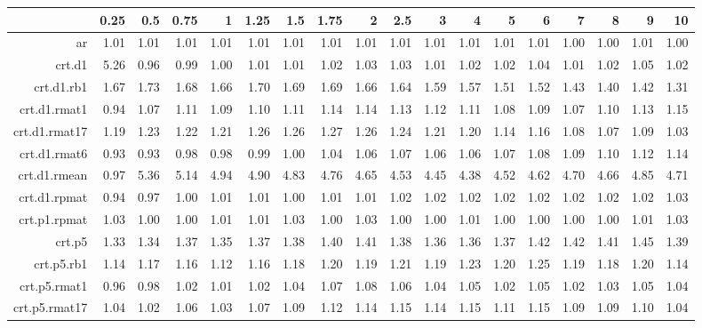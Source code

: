 \begin{tabular}{rrrrrrrrrrrrrrrrrr}
  \hline
 & 0.25 & 0.5 & 0.75 & 1 & 1.25 & 1.5 & 1.75 & 2 & 2.5 & 3 & 4 & 5 & 6 & 7 & 8 & 9 & 10 \\ 
  \hline
ar & 1.01 & 1.01 & 1.01 & 1.01 & 1.01 & 1.01 & 1.01 & 1.01 & 1.01 & 1.01 & 1.01 & 1.01 & 1.01 & 1.00 & 1.00 & 1.01 & 1.00 \\ 
  crt.d1 & 5.26 & 0.96 & 0.99 & 1.00 & 1.01 & 1.01 & 1.02 & 1.03 & 1.03 & 1.01 & 1.02 & 1.02 & 1.04 & 1.01 & 1.02 & 1.05 & 1.02 \\ 
  crt.d1.rb1 & 1.67 & 1.73 & 1.68 & 1.66 & 1.70 & 1.69 & 1.69 & 1.66 & 1.64 & 1.59 & 1.57 & 1.51 & 1.52 & 1.43 & 1.40 & 1.42 & 1.31 \\ 
  crt.d1.rmat1 & 0.94 & 1.07 & 1.11 & 1.09 & 1.10 & 1.11 & 1.14 & 1.14 & 1.13 & 1.12 & 1.11 & 1.08 & 1.09 & 1.07 & 1.10 & 1.13 & 1.15 \\ 
  crt.d1.rmat17 & 1.19 & 1.23 & 1.22 & 1.21 & 1.26 & 1.26 & 1.27 & 1.26 & 1.24 & 1.21 & 1.20 & 1.14 & 1.16 & 1.08 & 1.07 & 1.09 & 1.03 \\ 
  crt.d1.rmat6 & 0.93 & 0.93 & 0.98 & 0.98 & 0.99 & 1.00 & 1.04 & 1.06 & 1.07 & 1.06 & 1.06 & 1.07 & 1.08 & 1.09 & 1.10 & 1.12 & 1.14 \\ 
  crt.d1.rmean & 0.97 & 5.36 & 5.14 & 4.94 & 4.90 & 4.83 & 4.76 & 4.65 & 4.53 & 4.45 & 4.38 & 4.52 & 4.62 & 4.70 & 4.66 & 4.85 & 4.71 \\ 
  crt.d1.rpmat & 0.94 & 0.97 & 1.00 & 1.01 & 1.01 & 1.00 & 1.01 & 1.01 & 1.02 & 1.02 & 1.02 & 1.02 & 1.02 & 1.02 & 1.02 & 1.02 & 1.03 \\ 
  crt.p1.rpmat & 1.03 & 1.00 & 1.00 & 1.01 & 1.01 & 1.03 & 1.00 & 1.03 & 1.00 & 1.00 & 1.01 & 1.00 & 1.00 & 1.00 & 1.00 & 1.01 & 1.03 \\ 
  crt.p5 & 1.33 & 1.34 & 1.37 & 1.35 & 1.37 & 1.38 & 1.40 & 1.41 & 1.38 & 1.36 & 1.36 & 1.37 & 1.42 & 1.42 & 1.41 & 1.45 & 1.39 \\ 
  crt.p5.rb1 & 1.14 & 1.17 & 1.16 & 1.12 & 1.16 & 1.18 & 1.20 & 1.19 & 1.21 & 1.19 & 1.23 & 1.20 & 1.25 & 1.19 & 1.18 & 1.20 & 1.14 \\ 
  crt.p5.rmat1 & 0.96 & 0.98 & 1.02 & 1.01 & 1.02 & 1.04 & 1.07 & 1.08 & 1.06 & 1.04 & 1.05 & 1.02 & 1.05 & 1.02 & 1.03 & 1.05 & 1.04 \\ 
  crt.p5.rmat17 & 1.04 & 1.02 & 1.06 & 1.03 & 1.07 & 1.09 & 1.12 & 1.14 & 1.15 & 1.14 & 1.15 & 1.11 & 1.15 & 1.09 & 1.09 & 1.10 & 1.04 \\ 

\end{tabular}
